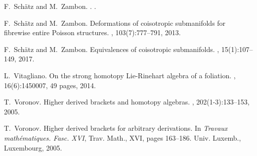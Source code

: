 \documentclass[11pt,thmsa]{amsart}
\theoremstyle{definition}
\begin{document}
F.~Sch\"atz and M.~Zambon.
.
.

F.~Sch{{\"a}}tz and M.~Zambon.
\newblock Deformations of coisotropic submanifolds for fibrewise entire
  {P}oisson structures.
, 103(7):777--791, 2013.

F.~Sch{\"a}tz and M.~Zambon.
\newblock Equivalences of coisotropic submanifolds.
, 15(1):107--149, 2017.

L.~Vitagliano.
\newblock On the strong homotopy {L}ie-{R}inehart algebra of a foliation.
, 16(6):{1450007, 49 pages}, 2014.

T.~Voronov.
\newblock Higher derived brackets and homotopy algebras.
, 202(1-3):133--153, 2005.

T.~Voronov.
\newblock Higher derived brackets for arbitrary derivations.
\newblock In {\em Travaux math\'ematiques. {F}asc. {XVI}}, Trav. Math., XVI,
  pages 163--186. Univ. Luxemb., Luxembourg, 2005.
 
\end{document}
